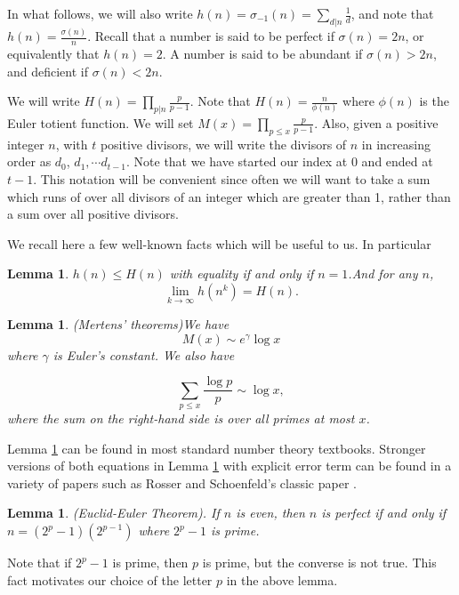 \documentclass{article}
\newtheorem{lemma}[theorem]{Lemma}
\begin{document}
In what follows, we will also write $h(n)=\sigma_{-1}(n) = \sum_{d|n}\frac{1}{d}$, and note that $h(n)= \frac{\sigma(n)}{n}$.  Recall that a number is said to be perfect if $\sigma(n)=2n$, or equivalently that $h(n)=2$. A number is said to be abundant if $\sigma(n) > 2n$, and deficient if $\sigma(n) <2n$.

We will write $H(n)= \prod_{p|n} \frac{p}{p-1}$. Note that $H(n)= \frac{n}{\phi(n)}$ where $\phi(n)$ is the Euler totient function.  We will set $M(x) = \prod_{p\leq x} \frac{p}{p-1}$. Also, given a positive integer $n$, with $t$ positive divisors, we will write the divisors of $n$ in increasing order as $d_0$, $d_1, \cdots d_{t-1}$. Note that we have started our index at $0$ and ended at $t-1$. This notation will be convenient since often we will want to take a sum which runs of over all divisors of an integer which are greater than 1, rather than a sum over all positive divisors.


We recall here a few well-known facts which will be useful to us. In particular

\begin{lemma} $h(n) \leq H(n)$ with equality if and only if $n=1$.\label{h(n) < H(n)} And for any $n$, $$\lim_{k \rightarrow \infty}h(n^k) = H(n).$$
\end{lemma}

\begin{lemma}(Mertens' theorems)\label{Mertens'theorem} We have  $$M(x) \sim e^\gamma \log x$$ where $\gamma$ is Euler's constant. We also have

$$\sum_{p \leq x} \frac{\log p}{p} \sim \log x,$$ where the sum on the right-hand side is over all primes at  most $x$.
\end{lemma}

Lemma \ref{Mertens'theorem} can be found in  most standard number theory textbooks. Stronger versions of both equations in Lemma \ref{Mertens'theorem} with explicit error term can be found in a variety of papers such as Rosser and Schoenfeld's classic paper \cite{RosserSchoenfeld1962}. 


\begin{lemma}(Euclid-Euler Theorem). \label{Euclid-Euler)} If $n$ is even, then $n$ is perfect if and only if $n= (2^p-1)(2^{p-1})$ where $2^p-1$ is prime.
\end{lemma}




Note that if $2^p-1$ is prime, then $p$ is prime, but the converse is not true.  This fact motivates our choice of the letter $p$ in the above lemma. 
\end{document}
